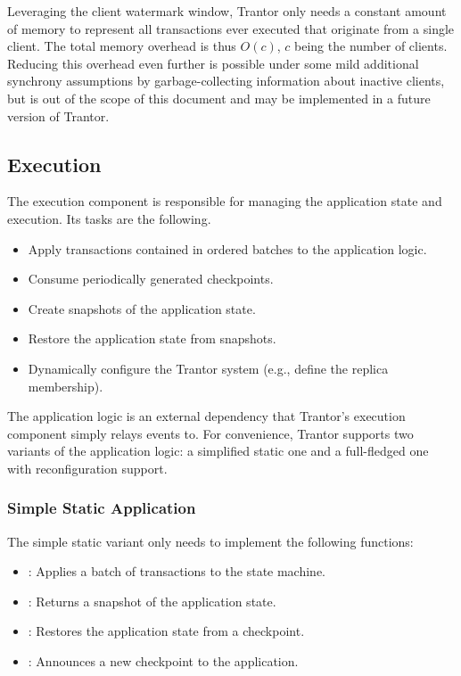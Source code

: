 \documentclass{article}
\begin{document}
Leveraging the client watermark window, Trantor only needs a constant amount of memory to represent
all transactions ever executed that originate from a single client.
The total memory overhead is thus $O(c)$, $c$ being the number of clients.
Reducing this overhead even further is possible under some mild additional synchrony assumptions by garbage-collecting information about inactive clients,
but is out of the scope of this document and may be implemented in a future version of Trantor.

\subsection{Execution}
\label{sec:execution}

The execution component is responsible for managing the application state and execution. Its tasks are the following.

\begin{itemize}
    \item Apply transactions contained in ordered batches to the application logic.
    \item Consume periodically generated checkpoints.
    \item Create snapshots of the application state.
    \item Restore the application state from snapshots.
    \item Dynamically configure the Trantor system (e.g., define the replica membership).
\end{itemize}

The application logic is an external dependency that Trantor’s execution component simply relays events to.
For convenience, Trantor supports two variants of the application logic: a simplified static one and a full-fledged one with reconfiguration support.

\subsubsection{Simple Static Application}

The simple static variant only needs to implement the following functions:

\begin{itemize}
    \item {}: Applies a batch of transactions to the state machine.
    \item {}: Returns a snapshot of the application state.
    \item {}: Restores the application state from a checkpoint.
    \item {}: Announces a new checkpoint to the application.
\end{itemize}
\end{document}
